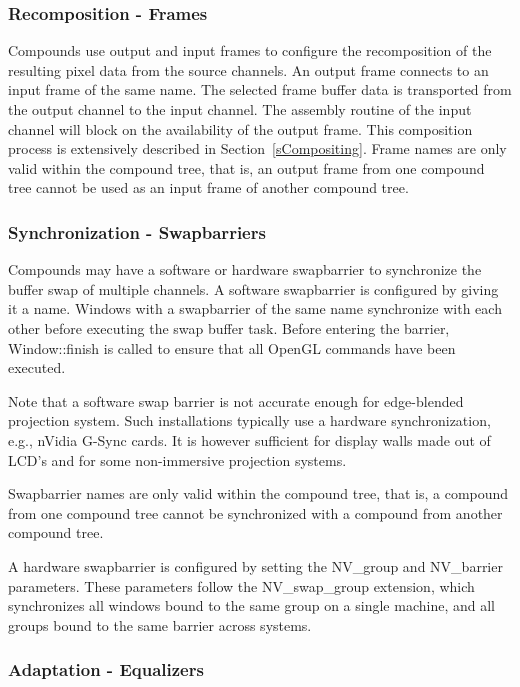 \documentclass[10pt,a4]{scrartcl}
\newcommand{\sref}[1]{Section~\ref{#1}}
\begin{document}
\subsubsection{Recomposition - Frames}
Compounds use output and input frames to configure the recomposition of
the resulting pixel data from the source channels. An output frame
connects to an input frame of the same name. The selected frame buffer
data is transported from the output channel to the input channel. The
assembly routine of the input channel will block on the availability of
the output frame. This composition process is extensively described in
\sref{sCompositing}. Frame names are only valid within the compound
tree, that is, an output frame from one compound tree cannot be used as
an input frame of another compound tree.

\subsubsection{\label{sSwapBarrier}Synchronization - Swapbarriers}
Compounds may have a software or hardware swapbarrier to synchronize the
buffer swap of multiple channels. A software swapbarrier is configured
by giving it a name. Windows with a swapbarrier of the same name
synchronize with each other before executing the swap buffer
task. Before entering the barrier, \textsf{Window::finish} is called to
ensure that all OpenGL commands have been executed.

Note that a software swap barrier is not accurate enough for
edge-blended projection system. Such installations typically use a
hardware synchronization, e.g., nVidia G-Sync cards. It is however
sufficient for display walls made out of LCD's and for some
non-immersive projection systems.

Swapbarrier names are only valid within the compound tree, that is, a
compound from one compound tree cannot be synchronized with a compound
from another compound tree.

A hardware swapbarrier is configured by setting the \textsf{NV\_group}
and \textsf{NV\_barrier} parameters. These parameters follow the
\textsf{NV\_swap\_group} extension, which synchronizes all windows bound
to the same group on a single machine, and all groups bound to the same
barrier across systems.

\subsubsection{\label{sEqualizers}Adaptation - Equalizers}
\end{document}
